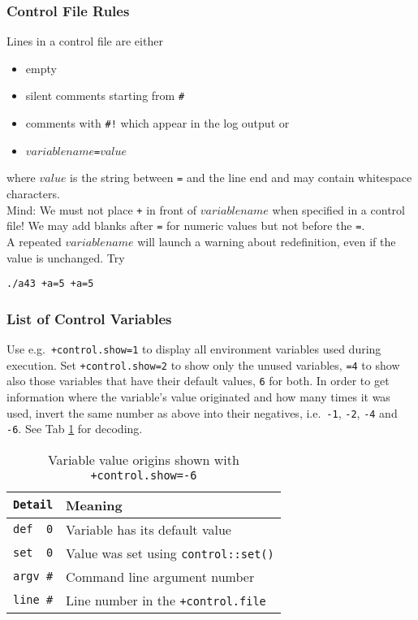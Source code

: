\documentclass[oribibl]{llncs}
\newcommand{\ttt}[1]{\texttt{#1}}
\begin{document}
\subsubsection{Control File Rules} \label{sec:control-file-rules}
%
Lines in a control file are either 
\begin{itemize}
    \item empty
    \item silent comments starting from \ttt{\#}
    \item comments with \ttt{\#!} which appear in the log output or
    \item $variablename$\ttt{=}$value$
\end{itemize}
where $value$ is the string between \ttt{=} and the line end and may contain whitespace characters.
\\
Mind: We must not place \ttt{+} in front of $variablename$ when specified in a control file!
We may add blanks after \ttt{=} for numeric values but not before the \ttt{=}.
\\
A repeated $variablename$ will launch a warning about redefinition, even if the value is unchanged. Try
\begin{verbatim}
./a43 +a=5 +a=5
\end{verbatim}

\subsubsection{List of Control Variables}
%
Use e.g.~\ttt{+control.show=1} to display all environment variables used during execution.
Set \ttt{+control.show=2} to show only the unused variables, \ttt{=4} to show also those variables that have their default values, \ttt{6} for both.
In order to get information where the variable's value originated and how many times it was used, invert the same number as above into their negatives, i.e.~\ttt{-1}, \ttt{-2}, \ttt{-4} and \ttt{-6}.
See Tab \ref{tab:control-show-details} for decoding. 
%
%
\begin{table}[ht!]
\caption[Variable value origins]{
Variable value origins shown with \ttt{+control.show=-6}
} \label{tab:control-show-details}
\centering
\begin{tabular}{|l|l|}
\hline
  	 \ttt{Detail}    & Meaning   \\
\hline
     \verb+def  0+   & Variable has its default value      \\
     \verb+set  0+   & Value was set using \ttt{control::set()} \\
     \ttt{argv \#}   & Command line argument number \\
     \ttt{line \#}   & Line number in the \ttt{+control.file} \\
\hline
\end{tabular}
\end{table}
\end{document}
